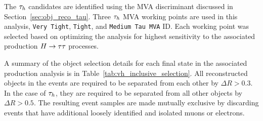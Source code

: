 The $\tau_{h}$ candidates are identified using the MVA discriminant discussed in
Section~\ref{sec:obj_reco_tau}.
Three $\tau_{h}$ MVA working points are used in this analysis,
\texttt{Very Tight}, \texttt{Tight}, and \texttt{Medium Tau MVA} ID. Each working point was selected based on
optimizing the analysis for highest sensitivity to the associated production
$H\to\tau\tau$ processes. 

A summary of the object selection details for each final state in the associated
production analysis is in Table~\ref{tab:vh_inclusive_selection}.
All reconstructed objects in the events are required to be separated from each 
other by $\Delta R > 0.3$. In the case of $\tau_{h}$, they are required to be 
separated from all other objects by $\Delta R > 0.5$. The resulting event samples are made mutually 
exclusive by discarding events that have additional loosely identified 
and isolated muons or electrons.

